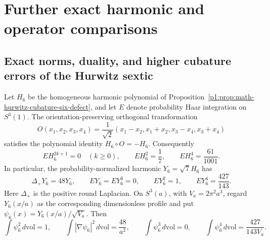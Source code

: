 \documentclass[11pt]{article}
\begin{document}
\section{Further exact harmonic and operator comparisons}
\label{p1:sec:v215-geometric-provider-completion}

\subsection{Exact norms, duality, and higher cubature errors of the Hurwitz sextic}
\label{p1:sec:v215-sextic-providers}

\begin{proposition}
\label{p1:prop:v215-sextic-moments}
Let \(H_6\) be the homogeneous harmonic polynomial of
Proposition~\ref{p1:prop:math-hurwitz-cubature-six-defect}, and let
\(E\) denote probability Haar integration on \(S^3(1)\). The
orientation-preserving orthogonal transformation
\[
 O(x_1,x_2,x_3,x_4)=\frac1{\sqrt2}
 (x_1-x_2,x_1+x_2,x_3-x_4,x_3+x_4)
\]
satisfies the polynomial identity \(H_6\circ O=-H_6\). Consequently
\[
 E H_6^{2k+1}=0\quad(k\geq0),\qquad
 E H_6^2=\frac17,\qquad E H_6^4=\frac{61}{1001}.
\]
In particular, the probability-normalized harmonic \(Y_6=\sqrt7H_6\)
has
\[
 \Delta_+Y_6=48Y_6,\qquad
 E Y_6=E Y_6^3=0,\qquad
 E Y_6^2=1,\qquad E Y_6^4=\frac{427}{143}.
\]
Here \(\Delta_+\) is the positive round Laplacian. On \(S^3(a)\),
with \(V_a=2\pi^2a^3\), regard \(Y_6(x/a)\) as the corresponding
dimensionless profile and put \(\psi_6(x)=Y_6(x/a)/\sqrt{V_a}\). Then
\[
 \int\psi_6^2\,d\mathrm{vol}=1,\qquad
 \int|\nabla\psi_6|^2\,d\mathrm{vol}=\frac{48}{a^2},\qquad
 \int\psi_6^3\,d\mathrm{vol}=0,\qquad
 \int\psi_6^4\,d\mathrm{vol}=\frac{427}{143V_a}.
\]
\end{proposition}
\end{document}
